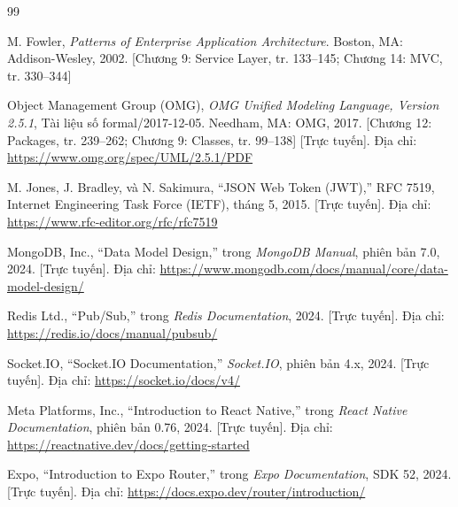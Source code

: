 ﻿\documentclass[a4paper,12pt,openany,oneside]{report}
\begin{document}
\begin{thebibliography}{99}

M. Fowler,
\textit{Patterns of Enterprise Application Architecture}.
Boston, MA: Addison-Wesley, 2002.
[Chương 9: Service Layer, tr. 133--145;
Chương 14: MVC, tr. 330--344]

Object Management Group (OMG),
\textit{OMG Unified Modeling Language, Version 2.5.1},
Tài liệu số formal/2017-12-05.
Needham, MA: OMG, 2017.
[Chương 12: Packages, tr. 239--262;
Chương 9: Classes, tr. 99--138]
[Trực tuyến]. Địa chỉ: \url{https://www.omg.org/spec/UML/2.5.1/PDF}

M. Jones, J. Bradley, và N. Sakimura,
``JSON Web Token (JWT),''
RFC 7519, Internet Engineering Task Force (IETF), tháng 5, 2015.
[Trực tuyến]. Địa chỉ: \url{https://www.rfc-editor.org/rfc/rfc7519}

MongoDB, Inc.,
``Data Model Design,''
trong \textit{MongoDB Manual}, phiên bản 7.0, 2024.
[Trực tuyến]. Địa chỉ:
\url{https://www.mongodb.com/docs/manual/core/data-model-design/}

Redis Ltd.,
``Pub/Sub,''
trong \textit{Redis Documentation}, 2024.
[Trực tuyến]. Địa chỉ: \url{https://redis.io/docs/manual/pubsub/}

Socket.IO,
``Socket.IO Documentation,''
\textit{Socket.IO}, phiên bản 4.x, 2024.
[Trực tuyến]. Địa chỉ: \url{https://socket.io/docs/v4/}

Meta Platforms, Inc.,
``Introduction to React Native,''
trong \textit{React Native Documentation}, phiên bản 0.76, 2024.
[Trực tuyến]. Địa chỉ: \url{https://reactnative.dev/docs/getting-started}

Expo,
``Introduction to Expo Router,''
trong \textit{Expo Documentation}, SDK 52, 2024.
[Trực tuyến]. Địa chỉ: \url{https://docs.expo.dev/router/introduction/}

\end{thebibliography}
\end{document}
